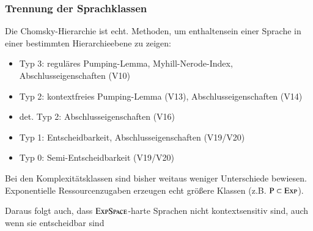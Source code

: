 \documentclass[aspectratio=1610,onlymath]{beamer}
\begin{document}
\begin{frame}[t]
{{}}

\end{frame}

\begin{frame}\frametitle{Trennung der Sprachklassen}

Die Chomsky-Hierarchie ist echt. Methoden, um 
enthaltensein einer Sprache in einer bestimmten Hierarchieebene zu zeigen:

\begin{itemize}
\item \alert{Typ 3}: reguläres Pumping-Lemma, Myhill-Nerode-Index, Abschlusseigenschaften (V10)
\item \alert{Typ 2}: kontextfreies Pumping-Lemma (V13), Abschlusseigenschaften (V14)
\item \alert{det. Typ 2}: Abschlusseigenschaften (V16)
\item \alert{Typ 1}: Entscheidbarkeit, Abschlusseigenschaften (V19/V20)
\item \alert{Typ 0}: Semi-Entscheidbarkeit (V19/V20)
\end{itemize}

Bei den Komplexitätsklassen sind bisher weitaus weniger Unterschiede bewiesen.
Exponentielle Ressourcenzugaben erzeugen echt größere Klassen (z.B. ${\textsc{P}}\subset{\textsc{Exp}}$).
\medskip

\textcolor{devilscss}{Daraus folgt auch, dass ${\textsc{ExpSpace}}$-harte Sprachen nicht kontextsensitiv sind, auch wenn sie entscheidbar sind}

\end{frame}


\newcommand{\myyes}{$\textcolor{darkgreen}{\checkmark}$}
\newcommand{\myno}{$\textcolor{darkred}{\times}$}
\end{document}
